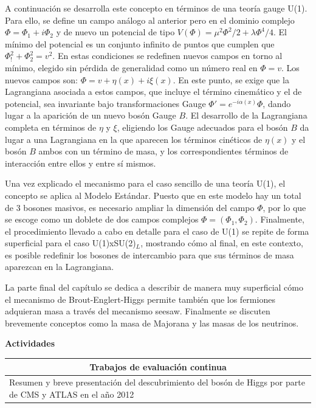 A continuación se desarrolla este concepto en términos de una teoría gauge U(1). Para ello, se define un campo análogo al anterior pero en el dominio complejo $\Phi = \Phi_1 + i \Phi_2$ y de nuevo un potencial de tipo $V(\Phi)=\mu^2\Phi^2/2 + \lambda\Phi^4/4$. El mínimo del potencial es un conjunto infinito de puntos que cumplen que $\Phi_!^2+\Phi_2^2 = v^2$. En estas condiciones se redefinen nuevos campos en torno al mínimo, elegido sin pérdida de generalidad como un número real en $\Phi=v$. Los nuevos campos son: $\Phi = v + \eta(x) + i \xi(x)$. En este punto, se exige que la Lagrangiana asociada a estos campos, que incluye el término cinemático y el de potencial, sea invariante bajo transformaciones Gauge $\Phi'=e^{-i\alpha(x)}\Phi$, dando lugar a la aparición de un nuevo bosón Gauge $B$. El desarrollo de la Lagrangiana completa en términos de $\eta$ y $\xi$, eligiendo los Gauge adecuados para el bosón $B$ da lugar a una Lagrangiana en la que aparecen los términos cinéticos de $\eta(x)$ y el bosón $B$ ambos con un término de masa, y los correspondientes términos de interacción entre ellos y entre sí mismos. 

Una vez explicado el mecanismo para el caso sencillo de una teoría U(1), el concepto se aplica al Modelo Estándar. Puesto que en este modelo hay un total de 3 bosones masivos, es necesario ampliar la dimensión del campo $\Phi$, por lo que se escoge como un doblete de dos campos complejos $\Phi=(\Phi_1, \Phi_2)$. Finalmente, el procedimiento llevado a cabo en detalle para el caso de U(1) se repite de forma superficial para el caso U(1)xSU(2)$_L$, mostrando cómo al final, en este contexto, es posible redefinir los bosones de intercambio para que sus términos de masa aparezcan en la Lagrangiana. 

La parte final del capítulo se dedica a describir de manera muy superficial cómo el mecanismo de Brout-Englert-Higgs permite también que los fermiones adquieran masa a través del mecanismo seesaw. Finalmente se discuten brevemente conceptos como la masa de Majorana y las masas de los neutrinos.


\textbf{Actividades}
\begin{center}
\begin{tabularx}{\textwidth}{|X|}
\hline\hline
\multicolumn{1}{|c|}{\textbf{Trabajos de evaluación continua}}\\
\hline\hline
Resumen y breve presentación del descubrimiento del bosón de Higgs por parte de CMS y ATLAS en el año 2012 \\
\hline\hline
\end{tabularx}
\end{center}




